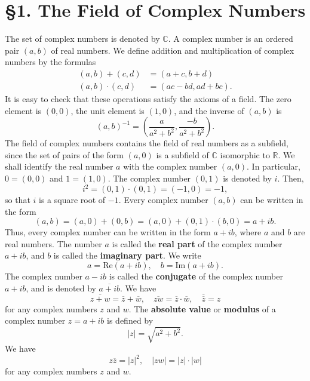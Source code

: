 \section*{§1. The Field of Complex Numbers}

The set of complex numbers is denoted by $\mathbb{C}$. A complex number is an ordered pair $(a,b)$ of real numbers. We define addition and multiplication of complex numbers by the formulas
\begin{align*}
(a,b)+(c,d)&=(a+c,b+d)\\
(a,b)\cdot(c,d)&=(ac-bd,ad+bc).
\end{align*}
It is easy to check that these operations satisfy the axioms of a field. The zero element is $(0,0)$, the unit element is $(1,0)$, and the inverse of $(a,b)$ is
\[
(a,b)^{-1}=\left(\frac{a}{a^{2}+b^{2}},\frac{-b}{a^{2}+b^{2}}\right).
\]
The field of complex numbers contains the field of real numbers as a subfield, since the set of pairs of the form $(a,0)$ is a subfield of $\mathbb{C}$ isomorphic to $\mathbb{R}$. We shall identify the real number $a$ with the complex number $(a,0)$. In particular, $0=(0,0)$ and $1=(1,0)$. The complex number $(0,1)$ is denoted by $i$. Then,
\[
i^{2}=(0,1)\cdot(0,1)=(-1,0)=-1,
\]
so that $i$ is a square root of $-1$. Every complex number $(a,b)$ can be written in the form
\[
(a,b)=(a,0)+(0,b)=(a,0)+(0,1)\cdot(b,0)=a+ib.
\]
Thus, every complex number can be written in the form $a+ib$, where $a$ and $b$ are real numbers. The number $a$ is called the \textbf{real part} of the complex number $a+ib$, and $b$ is called the \textbf{imaginary part}. We write
\[
a=\text{Re}(a+ib),\quad b=\text{Im}(a+ib).
\]
The complex number $a-ib$ is called the \textbf{conjugate} of the complex number $a+ib$, and is denoted by $\overline{a+ib}$. We have
\[
\overline{z+w}=\overline{z}+\overline{w},\quad \overline{zw}=\overline{z}\cdot\overline{w},\quad \overline{\overline{z}}=z
\]
for any complex numbers $z$ and $w$. The \textbf{absolute value} or \textbf{modulus} of a complex number $z=a+ib$ is defined by
\[
|z|=\sqrt{a^{2}+b^{2}}.
\]
We have
\[
z\overline{z}=|z|^{2},\quad |zw|=|z|\cdot|w|
\]
for any complex numbers $z$ and $w$.